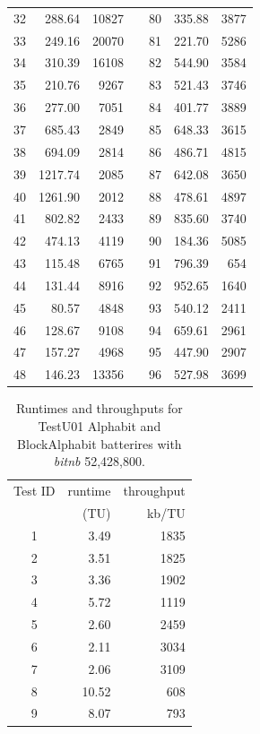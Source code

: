 \documentclass[
  digital,     %
  oneside,     %
  nosansbold,  %
  nocolorbold, %
  nolof,         %
  nolot,         %
]{fithesis4}
\begin{document}
\begin{longtable}[c]{c|r|rcc|r|r}
32 & 288.64 & 10827 &  & 80 & 335.88 & 3877\\
33 & 249.16 & 20070 &  & 81 & 221.70 & 5286\\
34 & 310.39 & 16108 &  & 82 & 544.90 & 3584\\
35 & 210.76 & 9267 &  & 83 & 521.43 & 3746\\
36 & 277.00 & 7051 &  & 84 & 401.77 & 3889\\
37 & 685.43 & 2849 &  & 85 & 648.33 & 3615\\
38 & 694.09 & 2814 &  & 86 & 486.71 & 4815\\
39 & 1217.74 & 2085 &  & 87 & 642.08 & 3650\\
40 & 1261.90 & 2012 &  & 88 & 478.61 & 4897\\
41 & 802.82 & 2433 &  & 89 & 835.60 & 3740\\
42 & 474.13 & 4119 &  & 90 & 184.36 & 5085\\
43 & 115.48 & 6765 &  & 91 & 796.39 & 654\\
44 & 131.44 & 8916 &  & 92 & 952.65 & 1640\\
45 & 80.57 & 4848 &  & 93 & 540.12 & 2411\\
46 & 128.67 & 9108 &  & 94 & 659.61 & 2961\\
47 & 157.27 & 4968 &  & 95 & 447.90 & 2907\\
48 & 146.23 & 13356 &  & 96 & 527.98 & 3699\\

 \end{longtable}


 \begin{table}[H]
  \begin{tabularx}{0.5\textwidth}{c|r|r}
  Test ID & runtime & throughput \\
         & (TU) &  kb/TU\\
  \midrule
        1 & 3.49 & 1835 \\
        2 & 3.51 & 1825 \\
        3 & 3.36 & 1902 \\
        4 & 5.72 & 1119 \\
        5 & 2.60 & 2459 \\
        6 & 2.11 & 3034 \\
        7 & 2.06 & 3109 \\
        8 & 10.52 & 608 \\
        9 & 8.07 & 793 \\
  \end{tabularx}
  \caption{Runtimes and throughputs for TestU01 Alphabit and BlockAlphabit batterires with \emph{bit\textunderscore nb} 52,428,800.}
  \label{tab:analysis_alphabit_time}
\end{table}
\end{document}
